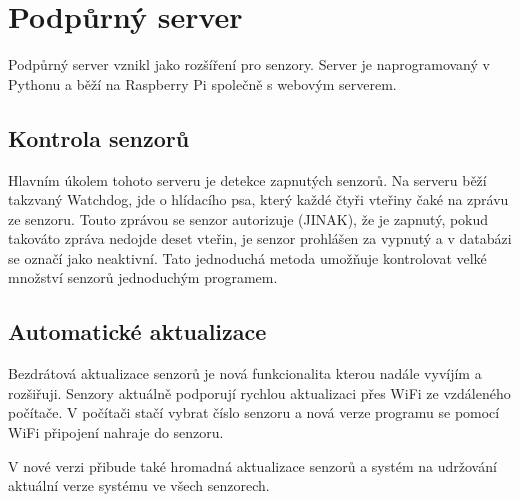 \chapter{Podpůrný server}
Podpůrný server vznikl jako rozšíření pro senzory.
Server je naprogramovaný v Pythonu a běží na Raspberry Pi společně s webovým serverem.  


\section{Kontrola senzorů}
Hlavním úkolem tohoto serveru je detekce zapnutých senzorů.
Na serveru běží takzvaný Watchdog, jde o hlídacího psa, který každé čtyři vteřiny čaké na zprávu ze senzoru.
Touto zprávou se senzor autorizuje (JINAK), že je zapnutý, pokud takováto zpráva nedojde deset vteřin, je senzor prohlášen za vypnutý a v databázi se označí jako neaktivní.
Tato jednoduchá metoda umožňuje kontrolovat velké množství senzorů jednoduchým programem.

\section{Automatické aktualizace}
Bezdrátová aktualizace senzorů je nová funkcionalita kterou nadále vyvíjím a rozšiřuji.
Senzory aktuálně podporují rychlou aktualizaci přes WiFi ze vzdáleného počítače.
V počítači stačí vybrat číslo senzoru a nová verze programu se pomocí WiFi připojení nahraje do senzoru.

V nové verzi přibude také hromadná aktualizace senzorů a systém na udržování aktuální verze systému ve všech senzorech.




\newpage